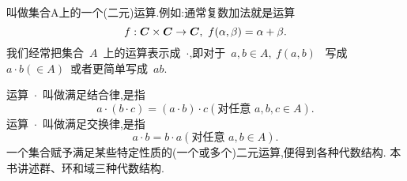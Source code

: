 叫做集合A上的一个(二元)运算.例如:通常复数加法就是运算
\begin{equation*}
    f:\boldsymbol{C} \times \boldsymbol{C} \rightarrow \boldsymbol{C},~f(\alpha,\beta)=\alpha+\beta.
\end{equation*}
我们经常把集合~$A$~上的运算表示成~$\cdot$,即对于~$a,b \in A,~f(a,b)$~
写成~$a \cdot b(\in A)$~或者更简单写成~$ab$.\par
运算~$\cdot$~叫做满足结合律,是指
\begin{equation*}
    a \cdot (b \cdot c)=(a \cdot b) \cdot c(\mbox{对任意~$a,b,c \in A$}).
\end{equation*}
运算~$\cdot$~叫做满足交换律,是指
\begin{equation*}
    a \cdot b=b \cdot a(\mbox{对任意~$a,b \in A$}).
\end{equation*}
一个集合赋予满足某些特定性质的(一个或多个)二元运算,便得到各种代数结构.
本书讲述群、环和域三种代数结构.

